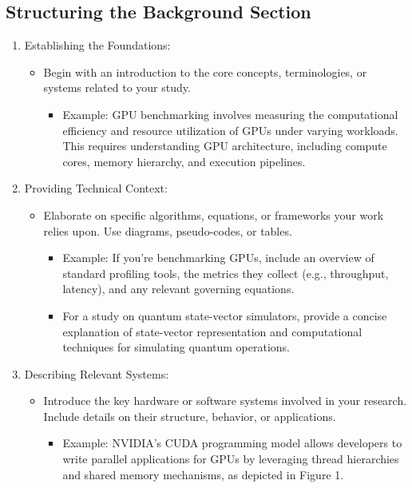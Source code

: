 \documentclass[conference]{IEEEtran}
\begin{document}
\subsection{Structuring the Background Section}
\begin{enumerate}
  \item Establishing the Foundations:  
  \begin{itemize}
    \item Begin with an introduction to the core concepts, terminologies, or systems related to your study.  
  \begin{itemize}
    \item Example: GPU benchmarking involves measuring the computational efficiency and resource utilization of GPUs under varying workloads. This requires understanding GPU architecture, including compute cores, memory hierarchy, and execution pipelines.  
  \end{itemize}
  \end{itemize}
\item Providing Technical Context:  
  \begin{itemize}
    \item Elaborate on specific algorithms, equations, or frameworks your work relies upon. Use diagrams, pseudo-codes, or tables. 
  \begin{itemize}
    \item Example: If you’re benchmarking GPUs, include an overview of standard profiling tools, the metrics they collect (e.g., throughput, latency), and any relevant governing equations.  
     \item For a study on quantum state-vector simulators, provide a concise explanation of state-vector representation and computational techniques for simulating quantum operations.  
  \end{itemize}
  \end{itemize}

\item Describing Relevant Systems:  
  \begin{itemize}
   \item Introduce the key hardware or software systems involved in your research. Include details on their structure, behavior, or applications.  
  \begin{itemize}
     \item Example: NVIDIA's CUDA programming model allows developers to write parallel applications for GPUs by leveraging thread hierarchies and shared memory mechanisms, as depicted in Figure 1.
  \end{itemize}
  \end{itemize}


\end{enumerate}
\end{document}
